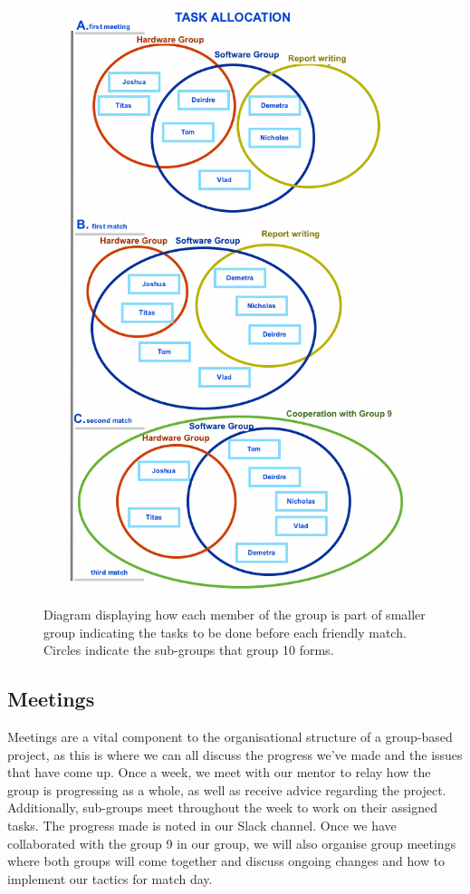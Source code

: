 \documentclass{article}
\begin{document}
\begin{figure}[H]
	\centering
	\begin{minipage}{1\textwidth}
		\centering
		\includegraphics[width=16cm, height=17cm]{task_allocation.png}\\
		\caption{Diagram displaying how each member of the group is part of smaller group indicating the tasks to be done before each friendly match. Circles indicate the sub-groups that group 10 forms.}
	\end{minipage}%
\end{figure}


\subsection{Meetings}
Meetings are a vital component to the organisational structure of a group-based
project, as this is where we can all discuss the progress we've made and the
issues that have come up. Once a week, we meet with our mentor to relay how the
group is progressing as a whole, as well as receive advice regarding the
project. Additionally, sub-groups meet throughout the week to work on their
assigned tasks. The progress made is noted in our Slack channel. Once we have
collaborated with the group 9 in our group, we will also organise group meetings
where both groups will come together and discuss ongoing changes and how to
implement our tactics for match day.
\end{document}
